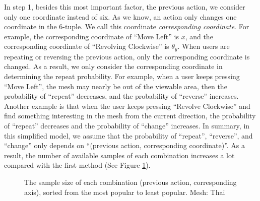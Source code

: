 In step 1, besides this most important factor, the previous action, we consider only one coordinate instead of six.
As we know, an action only changes one coordinate in the 6-tuple. We call this coordinate \textit{corresponding coordinate}.
For example, the corresponding coordinate of ``Move Left'' is $x$, and the corresponding coordinate of 
``Revolving Clockwise'' is $\theta_y$. 
When users are repeating or reversing the previous action, 
only the corresponding coordinate is changed. 
As a result, we only consider the corresponding coordinate in determining the repeat probability. 
For example, when a user keeps pressing ``Move Left'', the mesh may nearly be out of the viewable area, 
then the probability of ``repeat'' decreases, and the probability of ``reverse'' increases. 
Another example is that when the user keeps pressing ``Revolve Clockwise'' and find something interesting
in the mesh from the current direction,
the probability of ``repeat'' decreases and the probability of ``change'' increases.
In summary, in this simplified model, we assume that the probability of ``repeat'', ``reverse'', and ``change''
only depends on ``(previous action, corresponding coordinate)''.
As a result, the number of available samples of each combination increases a lot compared with the first method
(See Figure \ref{f:user:newsample}). 
\begin{figure}
    \centering
    \caption{The sample size of each combination (previous action, corresponding axis), 
    sorted from the most popular to least popular.  Mesh: Thai}
    \label{f:user:newsample}
\end{figure}

